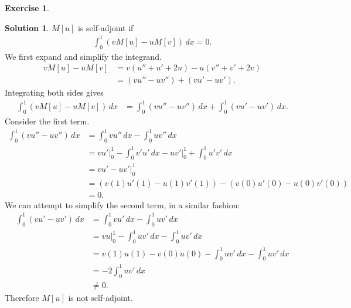 \documentclass{article}
\theoremstyle{definition}
\newtheorem*{exer*}{Exercise}
\newtheorem*{sln*}{Solution}
\begin{document}
\begin{exer*}
\begin{enumerate}
		\begin{sln*}
			$M[u]$ is self-adjoint if
			\begin{align*}
			\int^1_0 (vM[u] - uM[v])\,dx = 0.
			\end{align*}
			We first expand and simplify the integrand.
			\begin{align*}
			vM[u] - uM[v] &= v( u''+ u' + 2u) - u( v''+ v' + 2v)\\
			&= (vu'' - uv'') + (vu' - uv').
			\end{align*}
			Integrating both sides gives
			\begin{align*}
			\int^1_0 (vM[u] - uM[v])\,dx &= \int^1_0 (vu'' - uv'')\,dx + \int^1_0 (vu' - uv')\,dx.
			\end{align*} 
			Consider the first term.
			\begin{align*}
			\int^1_0 (vu'' - uv'')\,dx &= \int^1_0 vu''\,dx - \int^1_0 uv''\,dx\\
			&= vu'\bigg\vert^1_0 - \int^1_0 v'u'\,dx - uv'\bigg\vert^1_0 +  \int^1_0 u'v'\,dx\\
			&= vu' - uv' \bigg\vert^1_0\\
			&= (v(1)u'(1) - u(1)v'(1)) - (v(0)u'(0) - u(0)v'(0))\\
			&= 0. 
			\end{align*}
			We can attempt to simplify the second term, in a similar fashion:
			\begin{align*}
			\int^1_0 (vu' - uv')\,dx &= \int^1_0 vu'\,dx - \int^1_0   uv'\,dx\\
			&= vu\bigg\vert^1_0 - \int^1_0   uv'\,dx - \int^1_0   uv'\,dx\\
			&= v(1)u(1) - v(0)u(0) - \int^1_0   uv'\,dx - \int^1_0   uv'\,dx\\
			&= -2\int^1_0   uv'\,dx\\
			&\neq 0.
			\end{align*} 
			Therefore $M[u]$ is not self-adjoint. 
		\end{sln*}
		\newpage
		
		
		
		
		

\end{enumerate}
\end{exer*}
\end{document}
